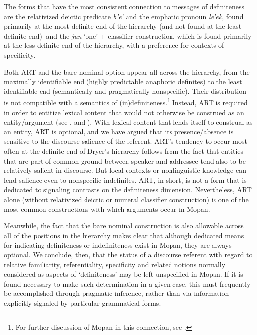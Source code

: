 \documentclass[output=paper]{langsci/langscibook}
\begin{document}
{
The forms that have the most consistent connection to messages of definiteness are the relativized deictic predicate {\emph{b'e'}} and the emphatic pronoun {\emph{le'ek}}, found primarily at the most definite end of the hierarchy (and not found at the least definite end), and the {\emph{jun}} `one' + classifier construction, which is found primarily at the less definite end of the hierarchy, with a preference for contexts of specificity.
}

Both ART and the bare nominal option appear all across the hierarchy, from the maximally identifiable end (highly predictable anaphoric definites) to the least identifiable end (semantically and pragmatically nonspecific). Their distribution is not compatible with a semantics of (in)definiteness.\footnote{{For further discussion of Mopan in this connection, see \cite{contini:morava:danziger:fc}.}} Instead, ART is required in order to entitize lexical content that would not otherwise be construed as an entity/argument (see , and \citealt{contini:morava:danziger:fc}).  With lexical content that lends itself to construal as an entity, ART is optional, and we have argued that its presence/absence is sensitive to the discourse salience of the referent.  ART's tendency to occur most often at the definite end of Dryer's hierarchy follows from the fact that entities that are part of common ground between speaker and addressee tend also to be relatively salient in discourse.  But local contexts or nonlinguistic knowledge can lend salience even to nonspecific indefinites. ART, in short, is not a form that is dedicated to signaling contrasts on the definiteness dimension.  Nevertheless, ART alone (without relativized deictic or numeral classifier construction) is one of the most common constructions with which arguments occur in Mopan.

Meanwhile, the fact that the bare nominal construction is also allowable across all of the positions in the hierarchy makes clear that although  dedicated means for indicating definiteness or indefiniteness exist in Mopan, they are always optional. We conclude, then, that the status of a discourse referent with regard to relative familiarity, referentiality, specificity and related notions normally considered as aspects of `definiteness' may be left unspecified in Mopan.  If it is found necessary to make such determination in a given case, this must frequently be accomplished through pragmatic inference, rather than via information explicitly signaled by particular grammatical forms.
\end{document}
